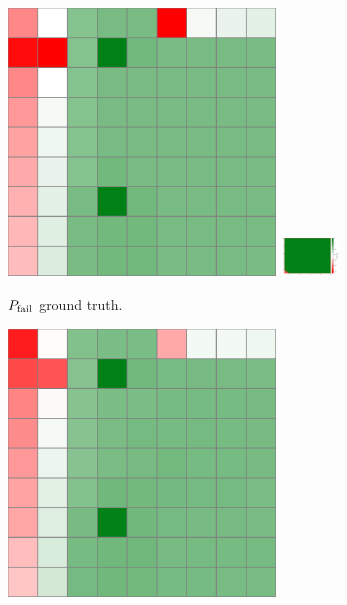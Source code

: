 \begin{figure}
    \centering
    \begin{subfigure}[b]{0.49\textwidth}
        \centering
        \includegraphics[width=0.78\textwidth]{figures/distribution_over_failures/vi_pfail.pdf}
        \includegraphics[width=0.17\textwidth, trim={18.4cm, 1cm, 0, 0}, clip]{figures/distribution_over_failures/colorbar.pdf}
        \caption{$P_{\rm fail}$ ground truth.}
        \label{fig:vi_pfail}
    \end{subfigure}
    \hfill
    \begin{subfigure}[b]{0.49\textwidth}
        \centering
        \includegraphics[width=0.78\textwidth]{figures/distribution_over_failures/dqn_pfail.pdf}

\end{subfigure}
\end{figure}
